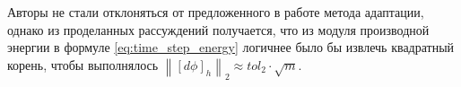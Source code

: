 Авторы не стали отклоняться от предложенного в работе \cite{zhang_time_step} метода адаптации, однако из проделанных рассуждений получается, что из модуля производной энергии в формуле \eqref{eq:time_step_energy} логичнее было бы извлечь квадратный корень, чтобы выполнялось $\left\| [d \phi]_h \right\|_2 \approx tol_2 \cdot \sqrt{m}$.